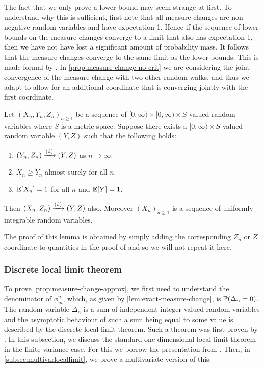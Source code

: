 The fact that we only prove a lower bound may seem strange at first. To understand why this is sufficient, first note that all measure changes are non-negative random variables and have expectation 1. Hence if the sequence of lower bounds on the measure changes converge to a limit that also has expectation 1, then we have not have lost a significant amount of probability mass. It follows that the measure changes converge to the same limit as the lower bounds. This is made formal by \citet[Lemma 4.8]{conchon--kerjanStableGraphMetric2021}. In \cref{prop:measure-change-no-crit} we are considering the joint convergence of the measure change with two other random walks, and thus we adapt \cite[Lemma 4.8]{conchon--kerjanStableGraphMetric2021} to allow for an additional coordinate that is converging jointly with the first coordinate.
\begin{lemma}
    \label{lem:sandwiching-lemma}
    Let $(X_n, Y_n, Z_n)_{n \geq 1}$ be a sequence of $[0, \infty) \times [0, \infty) \times S$-valued random variables where $S$ is a metric space. Suppose there exists a $[0, \infty) \times S$-valued random variable $(Y, Z)$ such that the following holds:
    \begin{enumerate}
        \item $(Y_n, Z_n) \todist (Y, Z)$ as $n \to \infty$.
        \item $X_n \geq Y_n$ almost surely for all $n$.
        \item $\E[X_n] = 1$ for all $n$ and $\E[Y] = 1$.
    \end{enumerate}
    Then $(X_n, Z_n) \todist (Y, Z)$ also. Moreover $(X_n)_{n \geq 1}$ is a sequence of uniformly integrable random variables.
\end{lemma}
The proof of this lemma is obtained by simply adding the corresponding $Z_n$ or $Z$ coordinate to quantities in the proof of \cite[Lemma 4.8]{conchon--kerjanStableGraphMetric2021} and so we will not repeat it here.

\subsubsection{Discrete local limit theorem}

To prove \cref{prop:measure-change-approx}, we first need to understand the denominator of $\phi^n_m$, which, as given by \cref{lem:exact-measure-change}, is $\P(\Delta_n = 0)$. The random variable $\Delta_n$ is a sum of independent integer-valued random variables and the asymptotic behaviour of such a sum being equal to some value is described by the discrete local limit theorem. Such a theorem was first proven by \citet{gnedenkoLocalLimitTheorem1948}. In this subsection, we discuss the standard one-dimensional local limit theorem in the finite variance case. For this we borrow the presentation from \citet[Section 3.5]{durrettProbabilityTheoryExamples2019}. Then, in \cref{subsec:multivarlocallimit}, we prove a multivariate version of this. 

